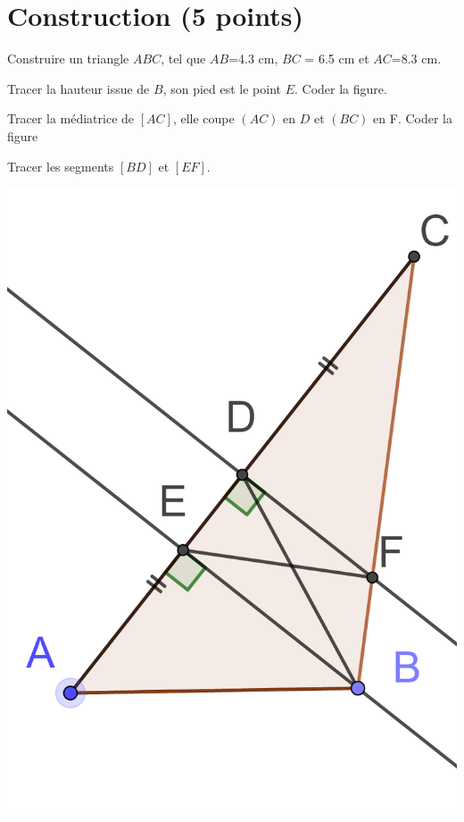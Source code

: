 \section{Construction (5 points)}

\begin{questions}
	\question[1] Construire un triangle $ABC$, tel que $AB$=\num{4.3} cm, $BC$ = \num{6.5} cm et $AC$=\num{8.3} cm.
	
	\question[1\half] Tracer la hauteur issue de $B$, son pied est le point $E$. Coder la figure.
	
	\question[1\half] Tracer la médiatrice de $[AC]$, elle coupe $(AC)$ en $D$ et $(BC)$ en F. Coder la figure
	
	\question[1] Tracer les segments $[BD]$ et $[EF]$. 
	\begin{solution}
		\begin{center}
			\includegraphics[scale=0.3]{img/ex2_fig}
		\end{center}
	\end{solution}
\end{questions}
  